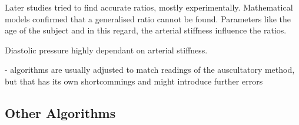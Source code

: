 Later studies tried to find accurate ratios, mostly experimentally. Mathematical models confirmed that a generalised ratio cannot be found. Parameters like the age of the subject and in this regard, the arterial stiffness influence the ratios. \cite{Babbs2012}

Diastolic pressure highly dependant on arterial stiffness. \cite{Babbs2012}



- algorithms are usually adjusted to match readings of the auscultatory method, but that has its own shortcommings and might introduce further errors

\subsection{Other Algorithms}
